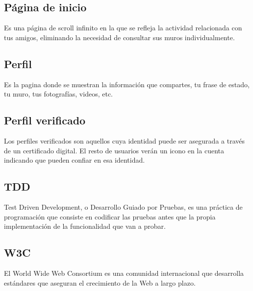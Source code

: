 \documentclass[12pt, a4paper, titlepage]{article}
\begin{document}
\subsection{Página de inicio}

Es una página de scroll infinito en la que se refleja la actividad relacionada con tus amigos, eliminando la necesidad de consultar sus muros individualmente.

\subsection{Perfil}

Es la pagina donde se muestran la información que compartes, tu frase de estado, tu muro, tus fotografías, videos, etc.

\subsection{Perfil verificado}

Los perfiles verificados son aquellos cuya identidad puede ser asegurada a través de un certificado digital. El resto de usuarios verán un icono en la cuenta indicando que pueden confiar en esa identidad.

\subsection{TDD}

Test Driven Development, o Desarrollo Guiado por Pruebas, es una práctica de programación que consiste en codificar las pruebas antes que la propia implementación de la funcionalidad que van a probar.

\subsection{W3C}

El World Wide Web Consortium es una comunidad internacional que desarrolla estándares que aseguran el crecimiento de la Web a largo plazo.
\end{document}
